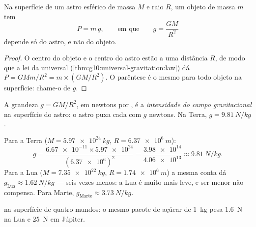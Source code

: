 \begin{proposition}\label{prop:g10:universal-gravitation:surfaceg}
Na superfície de um astro esférico de massa $M$ e raio $R$, um objeto de
massa $m$ tem 
\[
P = m\,g,
\qquad\text{em que}\qquad
g = \frac{G M}{R^2}
\]
depende só do astro, e não do objeto.
\end{proposition}

\begin{proof}
O centro do objeto e o centro do astro estão a uma distância $R$, de modo
que a lei da  universal
(\cref{thm:g10:universal-gravitation:law}) dá
$P = G M m / R^2 = m \times \left(G M / R^2\right)$. O parêntese é o
mesmo para todo objeto na superfície: chame-o de $g$.
\end{proof}

\begin{definition}\label{def:g10:universal-gravitation:fieldstrength}
A grandeza $g = G M / R^2$, em newtons por , é a
\emph{intensidade do campo gravitacional} na superfície do astro: o astro puxa cada  com
$g$ newtons. Na Terra, $g = \qty{9.81}{N/kg}$.
\end{definition}

\begin{example}[Calcular $g$]\label{ex:g10:universal-gravitation:gvalues}
Para a Terra ($M = \qty{5.97e24}{kg}$, $R = \qty{6.37e6}{m}$):
\[
g = \frac{\num{6.67e-11} \times \num{5.97e24}}{(\num{6.37e6})^2}
= \frac{\num{3.98e14}}{\num{4.06e13}}
\approx \qty{9.81}{N/kg}.
\]
Para a Lua ($M = \qty{7.35e22}{kg}$, $R = \qty{1.74e6}{m}$) a mesma conta
dá $g_{\text{Lua}} \approx \qty{1.62}{N/kg}$ --- seis vezes menos: a Lua
é muito mais leve, e ser menor não compensa. Para Marte,
$g_{\text{Marte}} \approx \qty{3.73}{N/kg}$.
\end{example}

\begin{omfigure}

{\small {} na superfície de quatro
mundos: o mesmo pacote de açúcar de \qty{1}{kg} pesa \qty{1.6}{N} na Lua
e \qty{25}{N} em Júpiter.}
\end{omfigure}

